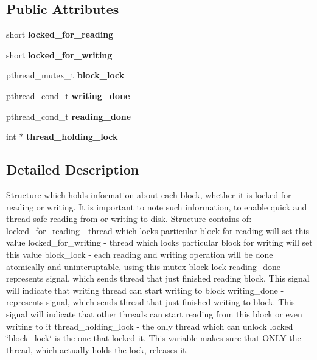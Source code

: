 \subsection*{Public Attributes}
\begin{DoxyCompactItemize}
\item 
\mbox{\label{structAK__block__activity_a947c78ec4ae287c627d85ce532a0a4f8}} 
short {\bfseries locked\+\_\+for\+\_\+reading}
\item 
\mbox{\label{structAK__block__activity_aa435ca3457738c4ceb3d087d5c215186}} 
short {\bfseries locked\+\_\+for\+\_\+writing}
\item 
\mbox{\label{structAK__block__activity_ae7c5e7630a1806d1a7479ede0ba59dcd}} 
pthread\+\_\+mutex\+\_\+t {\bfseries block\+\_\+lock}
\item 
\mbox{\label{structAK__block__activity_a6558ddec7ea39eee98d754d2269c6c84}} 
pthread\+\_\+cond\+\_\+t {\bfseries writing\+\_\+done}
\item 
\mbox{\label{structAK__block__activity_aae66eb07e2f614d849d3acc9f429e651}} 
pthread\+\_\+cond\+\_\+t {\bfseries reading\+\_\+done}
\item 
\mbox{\label{structAK__block__activity_a2a8239ee1bd19ab4ff0352e0dda2bff5}} 
int $\ast$ {\bfseries thread\+\_\+holding\+\_\+lock}
\end{DoxyCompactItemize}


\subsection{Detailed Description}
Structure which holds information about each block, whether it is locked for reading or writing. It is important to note such information, to enable quick and thread-\/safe reading from or writing to disk. Structure contains of\+: locked\+\_\+for\+\_\+reading -\/ thread which locks particular block for reading will set this value locked\+\_\+for\+\_\+writing -\/ thread which locks particular block for writing will set this value block\+\_\+lock -\/ each reading and writing operation will be done atomically and uninteruptable, using this mutex block lock reading\+\_\+done -\/ represents signal, which sends thread that just finished reading block. This signal will indicate that writing thread can start writing to block writing\+\_\+done -\/ represents signal, which sends thread that just finished writing to block. This signal will indicate that other threads can start reading from this block or even writing to it thread\+\_\+holding\+\_\+lock -\/ the only thread which can unlock locked \char`\"{}block\+\_\+lock\char`\"{} is the one that locked it. This variable makes sure that O\+N\+LY the thread, which actually holds the lock, releases it. 

